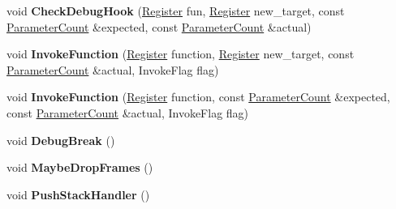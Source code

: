 \begin{DoxyCompactItemize}
\item 
\mbox{\label{classv8_1_1internal_1_1MacroAssembler_a2cf2b9ab50d1b6efcd90587f2502451b}} 
void {\bfseries Check\+Debug\+Hook} (\mbox{\hyperlink{classv8_1_1internal_1_1Register}{Register}} fun, \mbox{\hyperlink{classv8_1_1internal_1_1Register}{Register}} new\+\_\+target, const \mbox{\hyperlink{classv8_1_1internal_1_1ParameterCount}{Parameter\+Count}} \&expected, const \mbox{\hyperlink{classv8_1_1internal_1_1ParameterCount}{Parameter\+Count}} \&actual)
\item 
\mbox{\label{classv8_1_1internal_1_1MacroAssembler_a9a69d864f46bb7b56e46d977b24a9fc4}} 
void {\bfseries Invoke\+Function} (\mbox{\hyperlink{classv8_1_1internal_1_1Register}{Register}} function, \mbox{\hyperlink{classv8_1_1internal_1_1Register}{Register}} new\+\_\+target, const \mbox{\hyperlink{classv8_1_1internal_1_1ParameterCount}{Parameter\+Count}} \&actual, Invoke\+Flag flag)
\item 
\mbox{\label{classv8_1_1internal_1_1MacroAssembler_ab075992a89587b70b074351e93c41bb8}} 
void {\bfseries Invoke\+Function} (\mbox{\hyperlink{classv8_1_1internal_1_1Register}{Register}} function, const \mbox{\hyperlink{classv8_1_1internal_1_1ParameterCount}{Parameter\+Count}} \&expected, const \mbox{\hyperlink{classv8_1_1internal_1_1ParameterCount}{Parameter\+Count}} \&actual, Invoke\+Flag flag)
\item 
\mbox{\label{classv8_1_1internal_1_1MacroAssembler_abfa95b70b0f98e576cd0464a88443a0d}} 
void {\bfseries Debug\+Break} ()
\item 
\mbox{\label{classv8_1_1internal_1_1MacroAssembler_a24c22317b3c647e2829321dade36cf73}} 
void {\bfseries Maybe\+Drop\+Frames} ()
\item 
\mbox{\label{classv8_1_1internal_1_1MacroAssembler_af8ec8c2c3c525fa27b47125b8f2c90fb}} 
void {\bfseries Push\+Stack\+Handler} ()
\item 
\mbox{\label{classv8_1_1internal_1_1MacroAssembler_aaec1b780d52416c78d49b94483afa4f8}} 

\end{DoxyCompactItemize}
